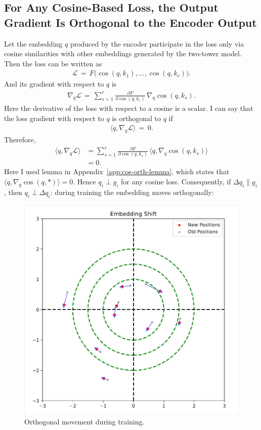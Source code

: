 \subsection{For Any Cosine-Based Loss, the Output Gradient Is Orthogonal to the Encoder Output}

Let the embedding $q$ produced by the encoder participate in the loss only via cosine similarities with other embeddings generated by the two-tower model. Then the loss can be written as
\begin{align}
\mathcal L \,=\, F\bigl(\cos(q,k_1),\dots,\cos(q,k_r)\bigr).
\end{align}
And its gradient with respect to $q$ is
\begin{align}
\nabla_q\mathcal L \,=\, \sum_{s=1}^{r} \frac{\partial F}{\partial \cos(q,k_s)}\, \nabla_q \cos(q,k_s). \label{eq:grad-cos-loss}
\end{align}
Here the derivative of the loss with respect to a cosine is a scalar. I can say that the loss gradient with respect to $q$ is orthogonal to $q$ if
\begin{align}
\langle q,\nabla_q\mathcal L \rangle \,=\, 0.
\end{align}
Therefore,
\begin{equation}
\begin{aligned}
\langle q,\nabla_q\mathcal L \rangle 
&= \sum_{s=1}^{r} \frac{\partial F}{\partial \cos(q,k_s)}\, \langle q,\nabla_q \cos(q,k_s) \rangle \\
&= 0.
\end{aligned}
\end{equation}
Here I used lemma in Appendix~\ref{app:cos-orth-lemma}, which states that $\langle q, \nabla_q \cos(q,\ast) \rangle = 0$.
Hence $q_i \perp g_i$ for any cosine loss. Consequently, if $\Delta q_i \parallel g_i$, then $q_i \perp \Delta q_i$: during training the embedding moves orthogonally:

\begin{figure}[!htbp]
\centering
\includegraphics[width=.95\columnwidth]{../draft_materials/figure_2_paper.pdf}
\caption{Orthogonal movement during training.}
\label{fig:cos-orth}
\end{figure}

